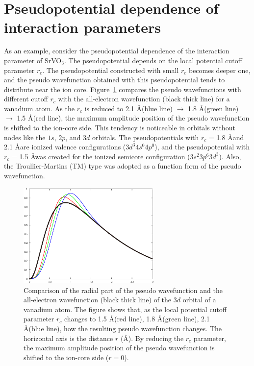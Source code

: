 \documentclass{article}
\begin{document}
\section{\label{pseudopotential}Pseudopotential dependence of interaction parameters} 
As an example, consider the pseudopotential dependence of the interaction parameter of SrVO$_3$. The pseudopotential depends on the local potential cutoff parameter $r_c$. The pseudopotential constructed with small $r_c$ becomes deeper one, and the pseudo wavefunction obtained with this pseudopotential tends to distribute near the ion core. Figure~\ref{pwn-vs-aewn} compares the pseudo wavefunctions with different cutoff $r_c$ with the all-electron wavefunction (black thick line) for a vanadium atom. As the $r_c$ is reduced to 2.1 \AA (blue line) $\to$ 1.8 \AA (green line) $\to$ 1.5 \AA (red line), the maximum amplitude position of the pseudo wavefunction is shifted to the ion-core side. This tendency is noticeable in orbitals without nodes like the $1s$, $2p$, and $3d$ orbitals. The pseudopotentials with $r_c$ = 1.8 \AA and 2.1 \AA are ionized valence configurations ($3d^{3}4s^{0}4p^{0}$), and the pseudopotential with $r_c$ = 1.5 \AA was created for the ionized semicore configuration ($3s^{2}3p^{6}3d^{3}$). Also, the Troullier-Martins (TM) type was adopted as a function form of the pseudo wavefunction. 
\begin{figure}[H] 
\centering
\includegraphics[width=7cm]{pwn_vs_aewn_V.eps}
\caption{Comparison of the radial part of the pseudo wavefunction and the all-electron wavefunction (black thick line) of the $3d$ orbital of a vanadium atom. The figure shows that, as the local potential cutoff parameter $r_c$ changes to 1.5 \AA (red line), 1.8 \AA (green line), 2.1 \AA (blue line), how the resulting pseudo wavefunction changes. The horizontal axis is the distance $r$ (\AA). By reducing the $r_c$ parameter, the maximum amplitude position of the pseudo wavefunction is shifted to the ion-core side ($r=0$).} 
\label{pwn-vs-aewn}
\end{figure}
\end{document}
